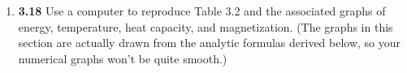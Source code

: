 \documentclass[fleqn]{article}
\begin{document}
\begin{enumerate}

    \item \textbf{3.18} Use a computer to reproduce Table 3.2 and the associated graphs of energy, temperature,
    heat capacity, and magnetization. (The graphs in this section are actually drawn from the analytic formulas
    derived below, so your numerical graphs won't be quite smooth.)


  \end{enumerate}
\end{document}
